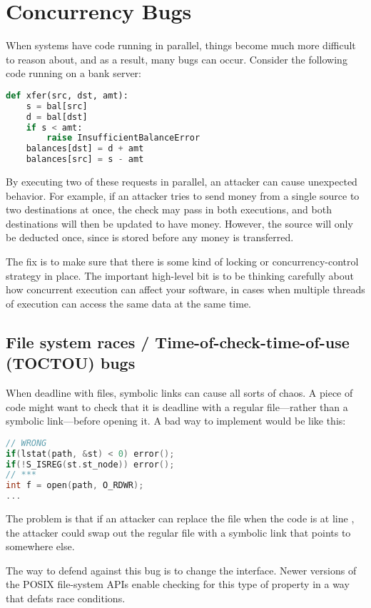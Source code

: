 \section{Concurrency Bugs}
When systems have code running in parallel, things become much more difficult to reason about, and as a result, many bugs can occur. Consider the following code running on a bank server:

\begin{lstlisting}[language=python]
def xfer(src, dst, amt):
	s = bal[src]
	d = bal[dst]
	if s < amt:
		raise InsufficientBalanceError
	balances[dst] = d + amt
	balances[src] = s - amt
\end{lstlisting}

By executing two of these  requests in parallel, an attacker can cause unexpected behavior. For example, if an attacker tries to send money from a single source to two destinations at once, the check  may pass in both executions, and both destinations will then be updated to have money. However, the source will only be deducted once, since  is stored before any money is transferred.

The fix is to make sure that there is some kind of locking or concurrency-control
strategy in place.
The important high-level bit is to be thinking carefully about how concurrent
execution can affect your software, in cases when multiple threads of
execution can access the same data at the same time.


\subsection{File system races / Time-of-check-time-of-use (TOCTOU) bugs}

When deadline with files, symbolic links can cause all sorts of chaos.
A piece of code might want to check that it is deadline with a regular
file---rather than a symbolic link---before opening it.
A bad way to implement would be like this:
\begin{lstlisting}[language=c]
// WRONG
if(lstat(path, &st) < 0) error();
if(!S_ISREG(st.st_node)) error();
// ***
int f = open(path, O_RDWR);
...
\end{lstlisting}
The problem is that if an attacker can replace the file when
the code is at line \ttt{***}, the attacker could swap out
the regular file with a symbolic link that points to somewhere else.

The way to defend against this bug is to change the interface.
Newer versions of the POSIX file-system APIs enable checking
for this type of property in a way that defats race conditions.


